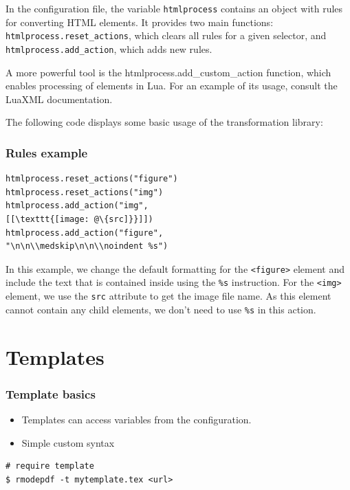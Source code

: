 In the configuration file, the variable \texttt{htmlprocess} contains an object with
rules for converting HTML elements. It provides two main functions:
\texttt{htmlprocess.reset\_actions}, which clears all rules for a given selector, and
\texttt{htmlprocess.add\_action}, which adds new rules.

A more powerful tool is the htmlprocess.add_custom_action function, which
enables processing of elements in Lua. For an example of its usage, consult the
LuaXML documentation.

The following code displays some basic usage of the transformation library:

\begin{frame}[fragile]
  \frametitle{Rules example}

\begin{verbatim}
htmlprocess.reset_actions("figure")
htmlprocess.reset_actions("img")
htmlprocess.add_action("img", 
[[\texttt{[image: @\{src]}}]])
htmlprocess.add_action("figure", 
"\n\n\\medskip\n\n\\noindent %s")
\end{verbatim}
\end{frame}

In this example, we change the default formatting for the \verb|<figure>| element and include the 
text that is contained inside using the \verb|%s| instruction. For the \verb|<img>| element, we use 
the \verb|src| attribute to get the image file name. As this element cannot contain any child elements,
we don't need to use \verb|%s| in this action. 

\section{Templates}

\begin{frame}[fragile]
  \frametitle{Template basics}

\begin{itemize}
  \item Templates can access variables from the configuration.
  \item Simple custom syntax
\end{itemize}

\begin{verbatim}
# require template
$ rmodepdf -t mytemplate.tex <url>
\end{verbatim}
\end{frame}



